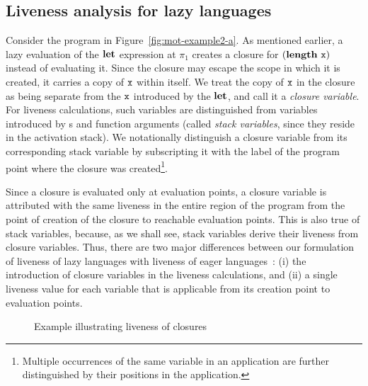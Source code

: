 \documentclass[9pt,preprint,letter,nonatbib]{sigplanconf}
\begin{document}


\renewcommand{\pp}[2]{\ensuremath{#1\!\!:\!#2}} %


\subsection{Liveness analysis for lazy languages}
\label{sec:liveness-analysis}
  

Consider the  program in Figure~\ref{fig:mot-example2-a}.   As mentioned
earlier, a lazy evaluation of the $\mbox{$\mathbf{ let}$}$ expression at $\pi_1$ creates
a closure  for $(\mathbf{length}~\mbox{\tt x})$  instead of  evaluating it.   Since the
closure may escape the scope in which it is created, it carries a copy
of $\mbox{\tt x}$ within itself.  We treat the  copy of $\mbox{\tt x}$ in the closure as
being separate from the $\mbox{\tt x}$ introduced  by the $\mbox{$\mathbf{ let}$}$, and call it a
\emph{closure  variable}.  For  liveness calculations,  such variables
are distinguished  from variables  introduced by  \LET s  and function
arguments  (called \emph{stack  variables},  since they  reside in  the
activation  stack).   We notationally distinguish  a closure  variable
from  its corresponding  stack variable  by subscripting  it with  the
label of the program   point  where   the   closure  was   created\footnote{Multiple
  occurrences  of the  same  variable in  an  application are  further
  distinguished by their positions in the application.}.


  Since a  closure is evaluated  only at evaluation points,  a closure
  variable is attributed  with the same liveness in  the entire region
  of  the  program from  the  point  of  creation  of the  closure  to
  reachable evaluation points.  This is  also true of stack variables,
  because, as we shall see, stack variables derive their liveness from
  closure variables. Thus, there are two major differences between our
  formulation of  liveness of  lazy languages  with liveness  of eager
  languages~\cite{asati14lgc}:   (i)  the   introduction  of   closure
  variables in the  liveness calculations, and (ii)  a single liveness
  value for each  variable that is applicable from  its creation point
  to evaluation points.

\begin{figure}[t]
    
  \caption{Example illustrating liveness of closures}\label{fig:lv-closure}
\end{figure}

\end{document}
